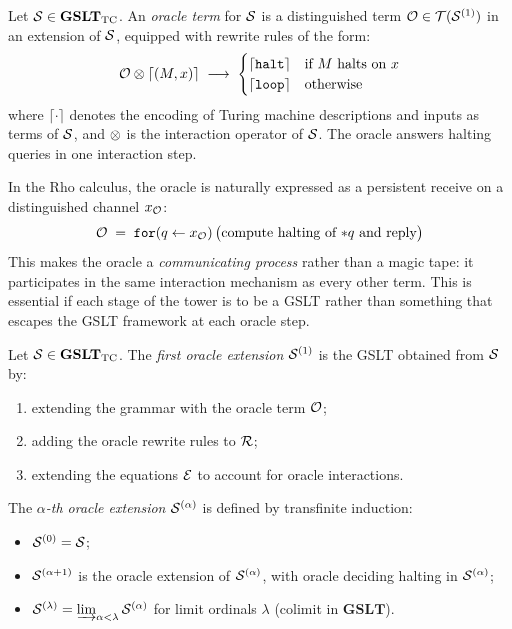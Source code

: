 \begin{definition}
Let $\mathcal{S} \in \mathbf{GSLT}_{\mathrm{TC}}$.
An \emph{oracle term} for $\mathcal{S}$ is a distinguished term
$\mathcal{O} \in \mathcal{T}(\mathcal{S}^{(1)})$ in an extension of $\mathcal{S}$,
equipped with rewrite rules of the form:
\[
  \mathcal{O} \otimes \lceil (M, x) \rceil \;\longrightarrow\;
  \begin{cases}
    \lceil \mathtt{halt} \rceil & \text{if } M \text{ halts on } x \\
    \lceil \mathtt{loop} \rceil & \text{otherwise}
  \end{cases}
\]
where $\lceil \cdot \rceil$ denotes the encoding of Turing machine
descriptions and inputs as terms of $\mathcal{S}$, and $\otimes$ is the
interaction operator of $\mathcal{S}$.
The oracle answers halting queries in one interaction step.
\end{definition}

\begin{remark}
In the Rho calculus, the oracle is naturally expressed as a
persistent receive on a distinguished channel $x_{\mathcal{O}}$:
\[
  \mathcal{O} \;=\; \mathtt{for}(q \leftarrow x_{\mathcal{O}})\,
  \bigl( \text{compute halting of } {*}q \text{ and reply} \bigr)
\]
This makes the oracle a \emph{communicating process} rather than
a magic tape: it participates in the same interaction mechanism as
every other term.
This is essential if each stage of the tower is to be a GSLT rather
than something that escapes the GSLT framework at each oracle step.
\end{remark}

\begin{definition}
\label{def:oracle-ext}
Let $\mathcal{S} \in \mathbf{GSLT}_{\mathrm{TC}}$.
The \emph{first oracle extension} $\mathcal{S}^{(1)}$ is the GSLT obtained
from $\mathcal{S}$ by:
\begin{enumerate}[label=(\roman*)]
  \item extending the grammar with the oracle term $\mathcal{O}$;
  \item adding the oracle rewrite rules to $\mathcal{R}$;
  \item extending the equations $\mathcal{E}$ to account for oracle
        interactions.
\end{enumerate}
The \emph{$\alpha$-th oracle extension} $\mathcal{S}^{(\alpha)}$ is defined
by transfinite induction:
\begin{itemize}[itemsep=2pt]
  \item $\mathcal{S}^{(0)} = \mathcal{S}$;
  \item $\mathcal{S}^{(\alpha+1)}$ is the oracle extension of $\mathcal{S}^{(\alpha)}$,
        with oracle deciding halting in $\mathcal{S}^{(\alpha)}$;
  \item $\mathcal{S}^{(\lambda)} = \varinjlim_{\alpha < \lambda} \mathcal{S}^{(\alpha)}$
        for limit ordinals $\lambda$ (colimit in $\mathbf{GSLT}$).
\end{itemize}
\end{definition}

